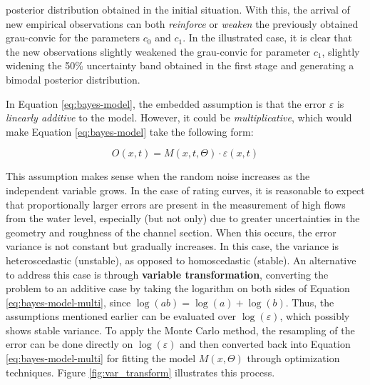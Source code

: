 \documentclass[./main_en.tex]{subfiles}
\begin{document}
posterior distribution obtained in the initial situation. With this, the arrival of new empirical observations can both \textit{reinforce} or \textit{weaken} the previously obtained \gls{grau-convic} for the parameters $c_0$ and $c_1$. In the illustrated case, it is clear that the new observations slightly weakened the \gls{grau-convic} for parameter $c_1$, slightly widening the 50\% uncertainty band obtained in the first stage and generating a bimodal posterior distribution.

\par In Equation \eqref{eq:bayes-model}, the embedded assumption is that the error $\varepsilon$ is \textit{linearly additive} to the \gls{model}. However, it could be \textit{multiplicative}, which would make Equation \eqref{eq:bayes-model} take the following form:
\begin{linenomath*}
\begin{equation}
\label{eq:bayes-model-multi}
    O(x, t) = M(x, t, \Theta) \cdot \varepsilon(x, t)
\end{equation}
\end{linenomath*}
This assumption makes sense when the random noise increases as the independent variable grows. In the case of rating curves, it is reasonable to expect that proportionally larger errors are present in the measurement of high flows from the water level, especially (but not only) due to greater uncertainties in the geometry and roughness of the channel section. When this occurs, the error variance is not constant but gradually increases. In this case, the variance is heteroscedastic (unstable), as opposed to homoscedastic (stable). An alternative to address this case is through \textbf{variable transformation}, converting the problem to an additive case by taking the logarithm on both sides of Equation \eqref{eq:bayes-model-multi}, since $\log(ab) = \log(a) + \log(b)$. Thus, the assumptions mentioned earlier can be evaluated over $\log(\varepsilon)$, which possibly shows stable variance. To apply the Monte Carlo method, the resampling of the error can be done directly on $\log(\varepsilon)$ and then converted back into Equation \eqref{eq:bayes-model-multi} for fitting the \gls{model} $M(x, \Theta)$ through optimization techniques. Figure \ref{fig:var_transform} illustrates this process.
\end{document}

